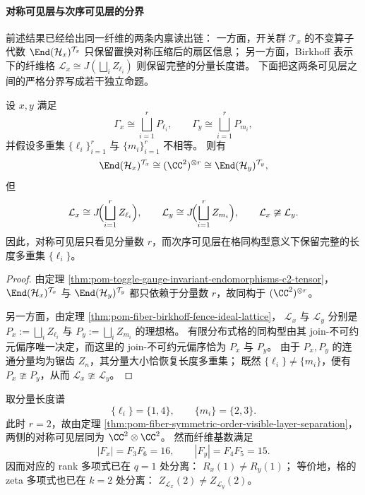 \paragraph{对称可见层与次序可见层的分界}
前述结果已经给出同一纤维的两条内禀读出链：
一方面，开关群 \(\mathcal T_x\) 的不变算子代数
\(\End(\mathcal H_x)^{\mathcal T_x}\)
只保留置换对称压缩后的扇区信息；
另一方面，Birkhoff 表示下的纤维格
\(\mathcal L_x\cong J(\bigsqcup_i Z_{\ell_i})\)
则保留完整的分量长度谱。
下面把这两条可见层之间的严格分界写成若干独立命题。

\begin{theorem}[对称可见层与次序可见层的严格分裂]\label{thm:pom-fiber-symmetric-order-visible-layer-separation}
设 \(x,y\) 满足
\[
\Gamma_x\cong \bigsqcup_{i=1}^r P_{\ell_i},
\qquad
\Gamma_y\cong \bigsqcup_{i=1}^r P_{m_i},
\]
并假设多重集 \(\{\ell_i\}_{i=1}^r\) 与 \(\{m_i\}_{i=1}^r\) 不相等。
则有
\[
\End(\mathcal H_x)^{\mathcal T_x}
\cong
(\CC^2)^{\otimes r}
\cong
\End(\mathcal H_y)^{\mathcal T_y},
\]
但
\[
\mathcal L_x
\cong
J\!\Bigl(\bigsqcup_{i=1}^r Z_{\ell_i}\Bigr),
\qquad
\mathcal L_y
\cong
J\!\Bigl(\bigsqcup_{i=1}^r Z_{m_i}\Bigr),
\qquad
\mathcal L_x\ncong \mathcal L_y.
\]
因此，对称可见层只看见分量数 \(r\)，而次序可见层在格同构型意义下保留完整的长度多重集 \(\{\ell_i\}\)。
\end{theorem}

\begin{proof}
由定理 \ref{thm:pom-toggle-gauge-invariant-endomorphisms-c2-tensor}，
\(\End(\mathcal H_x)^{\mathcal T_x}\) 与 \(\End(\mathcal H_y)^{\mathcal T_y}\) 都只依赖于分量数 \(r\)，故同构于 \((\CC^2)^{\otimes r}\)。
\par
另一方面，由定理 \ref{thm:pom-fiber-birkhoff-fence-ideal-lattice}，
\(\mathcal L_x\) 与 \(\mathcal L_y\) 分别是
\(P_x:=\bigsqcup_i Z_{\ell_i}\) 与 \(P_y:=\bigsqcup_i Z_{m_i}\) 的理想格。
有限分布式格的同构型由其 join-不可约元偏序唯一决定，而这里的 join-不可约元偏序恰为 \(P_x\) 与 \(P_y\)。
由于 \(P_x,P_y\) 的连通分量均为锯齿 \(Z_n\)，其分量大小恰恢复长度多重集；
既然 \(\{\ell_i\}\neq\{m_i\}\)，便有 \(P_x\ncong P_y\)，从而 \(\mathcal L_x\ncong\mathcal L_y\)。
\end{proof}

\begin{remark}[同一分量数下的最小分离样本]\label{rem:pom-fiber-symmetric-order-visible-layer-example}
取分量长度谱
\[
\{\ell_i\}=\{1,4\},
\qquad
\{m_i\}=\{2,3\}.
\]
此时 \(r=2\)，故由定理 \ref{thm:pom-fiber-symmetric-order-visible-layer-separation}，
两侧的对称可见层同为 \(\CC^2\otimes \CC^2\)。
然而纤维基数满足
\[
|F_x|=F_3F_6=16,
\qquad
|F_y|=F_4F_5=15.
\]
因而对应的 rank 多项式已在 \(q=1\) 处分离：
\(
R_x(1)\neq R_y(1)
\)；
等价地，格的 zeta 多项式也已在 \(k=2\) 处分离：
\(
Z_{\mathcal L_x}(2)\neq Z_{\mathcal L_y}(2)
\)。
\end{remark}

